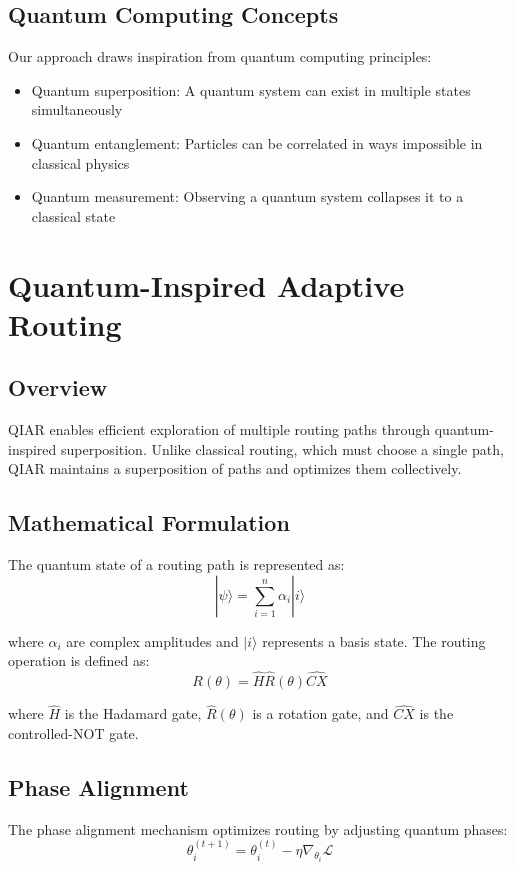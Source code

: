 \documentclass[10pt,twocolumn]{article}
\begin{document}
\subsection{Quantum Computing Concepts}
Our approach draws inspiration from quantum computing principles:
\begin{itemize}
    \item Quantum superposition: A quantum system can exist in multiple states simultaneously
    \item Quantum entanglement: Particles can be correlated in ways impossible in classical physics
    \item Quantum measurement: Observing a quantum system collapses it to a classical state
\end{itemize}

\section{Quantum-Inspired Adaptive Routing}
\subsection{Overview}
QIAR enables efficient exploration of multiple routing paths through quantum-inspired superposition. Unlike classical routing, which must choose a single path, QIAR maintains a superposition of paths and optimizes them collectively.

\subsection{Mathematical Formulation}
The quantum state of a routing path is represented as:
\begin{equation}
    |\psi\rangle = \sum_{i=1}^n \alpha_i |i\rangle
\end{equation}

where $\alpha_i$ are complex amplitudes and $|i\rangle$ represents a basis state. The routing operation is defined as:
\begin{equation}
    R(\theta) = \hat{H}\hat{R}(\theta)\hat{CX}
\end{equation}

where $\hat{H}$ is the Hadamard gate, $\hat{R}(\theta)$ is a rotation gate, and $\hat{CX}$ is the controlled-NOT gate.

\subsection{Phase Alignment}
The phase alignment mechanism optimizes routing by adjusting quantum phases:
\begin{equation}
    \theta_i^{(t+1)} = \theta_i^{(t)} - \eta\nabla_{\theta_i}\mathcal{L}
\end{equation}
\end{document}
